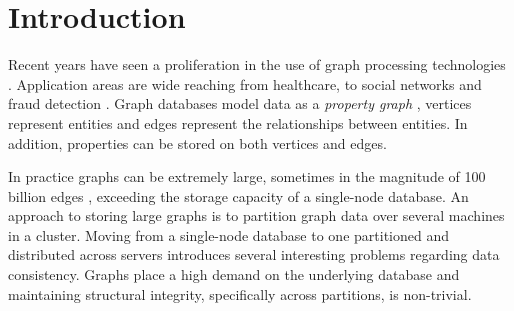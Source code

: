 \documentclass[sigplan,10pt]{acmart}
\begin{document}





\maketitle

\section{Introduction}
\label{sec:introduction}

Recent years have seen a proliferation in the use of graph processing technologies \cite{Besta2019}. Application areas are wide reaching from healthcare, to social networks and fraud detection \cite{Eifrem2016}. Graph databases model data as a \textit{property graph} \cite{Robinson2015}, vertices represent entities and edges represent the relationships between entities. In addition, properties can be stored on both vertices and edges.

In practice graphs can be extremely large, sometimes in the magnitude of 100 billion edges \cite{Sahu2017}, exceeding the storage capacity of a single-node database. An approach to storing large graphs is to partition graph data over several machines in a cluster. Moving from a single-node database to one partitioned and distributed across servers introduces several interesting problems regarding data consistency. Graphs place a high demand on the underlying database and maintaining structural integrity, specifically across partitions, is non-trivial.
\end{document}
